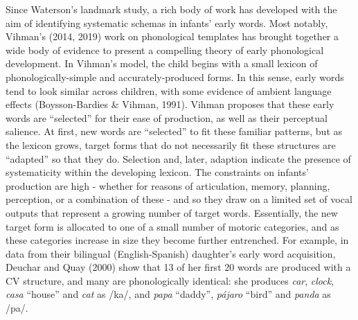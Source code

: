 \documentclass[
  english,
  man,floatsintext]{apa6}
\begin{document}
Since Waterson's landmark study, a rich body of work has developed with the aim of identifying systematic schemas in infants' early words. Most notably, Vihman's (2014, 2019) work on phonological templates has brought together a wide body of evidence to present a compelling theory of early phonological development. In Vihman's model, the child begins with a small lexicon of phonologically-simple and accurately-produced forms. In this sense, early words tend to look similar across children, with some evidence of ambient language effects (Boysson-Bardies \& Vihman, 1991). Vihman proposes that these early words are \enquote{selected} for their ease of production, as well as their perceptual salience. At first, new words are \enquote{selected} to fit these familiar patterns, but as the lexicon grows, target forms that do not necessarily fit these structures are \enquote{adapted} so that they do. Selection and, later, adaption indicate the presence of systematicity within the developing lexicon. The constraints on infants' production are high - whether for reasons of articulation, memory, planning, perception, or a combination of these - and so they draw on a limited set of vocal outputs that represent a growing number of target words. Essentially, the new target form is allocated to one of a small number of motoric categories, and as these categories increase in size they become further entrenched. For example, in data from their bilingual (English-Spanish) daughter's early word acquisition, Deuchar and Quay (2000) show that 13 of her first 20 words are produced with a CV structure, and many are phonologically identical: she produces \emph{car}, \emph{clock}, \emph{casa} \enquote{house} and \emph{cat} as /ka/, and \emph{papa} \enquote{daddy}, \emph{pájaro} \enquote{bird} and \emph{panda} as /pa/.
\end{document}
